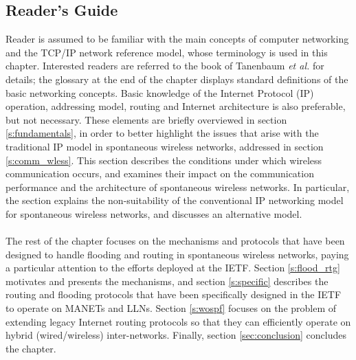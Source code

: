 \subsection{Reader's Guide}

Reader is assumed to be familiar with the main concepts of computer networking and the TCP/IP network reference model, whose terminology is used in this chapter. Interested readers are referred to the book of Tanenbaum {\em et al.} \cite{tanenbaum} for details; the glossary at the end of the chapter displays standard definitions of the basic networking concepts. Basic knowledge of the Internet Protocol (IP) operation, addressing model, routing and Internet architecture is also preferable, but not necessary. These elements are briefly overviewed in section \ref{s:fundamentals}, in order to better highlight the issues that arise with the traditional IP model in spontaneous wireless networks, addressed in section \ref{s:comm_wless}. This section describes the conditions under which wireless communication occurs, and examines their impact on the communication performance and the architecture of spontaneous wireless networks. In particular, the section explains the non-suitability of the conventional IP networking model for spontaneous wireless networks, and discusses an alternative model. \ \\ \ \\ 
%
The rest of the chapter focuses on the mechanisms and protocols that have been designed to handle flooding and routing in spontaneous wireless networks, paying a particular attention to the efforts deployed at the IETF. Section \ref{s:flood_rtg} motivates and presents the mechanisms, and section \ref{s:specific} describes the routing and flooding protocols that have been specifically designed in the IETF to operate on MANETs and LLNs. Section \ref{s:wospf} focuses on the problem of extending legacy Internet routing protocols so that they can efficiently operate on hybrid (wired/wireless) inter-networks. Finally, section \ref{sec:conclusion} concludes the chapter.
